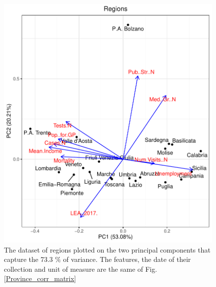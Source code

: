 \documentclass[
12pt, %
a4paper, %
oneside, %
headinclude,footinclude, %
BCOR5mm, %
]{scrartcl}
\begin{document}
\begin{figure}[h]
\begin{center}
\includegraphics[scale=1]{Pic/Regions_FULL_PCA.pdf}
\caption{The dataset of regions plotted on the two principal components that capture the 73.3 $\% $ of variance. The features, the date of their collection and unit of measure are the same of Fig. \ref{Province_corr_matrix}}
\label{Regions_FULL_PCA}
\end{center}
\end{figure}




\clearpage







\renewcommand{\refname}{\spacedlowsmallcaps{References}} %




\end{document}
